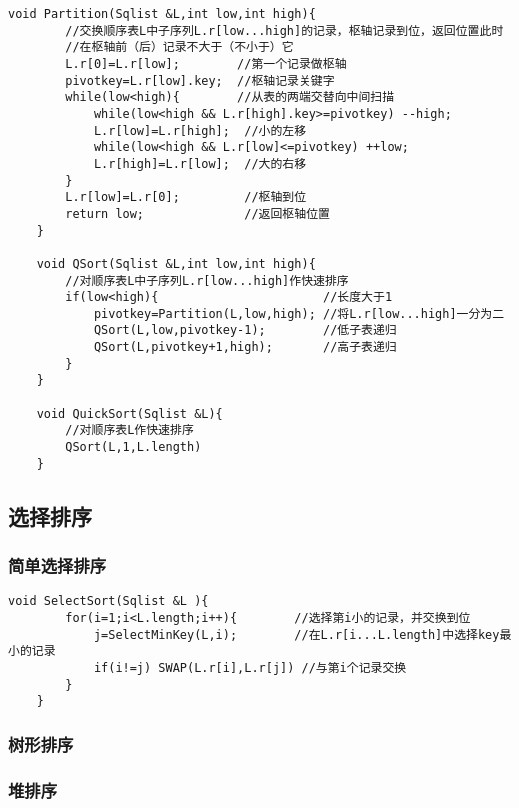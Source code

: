 \documentclass[UTF8]{ctexart}
\begin{document}
\begin{lstlisting}[style=v1]
    void Partition(Sqlist &L,int low,int high){
        //交换顺序表L中子序列L.r[low...high]的记录，枢轴记录到位，返回位置此时
        //在枢轴前（后）记录不大于（不小于）它
        L.r[0]=L.r[low];        //第一个记录做枢轴
        pivotkey=L.r[low].key;  //枢轴记录关键字
        while(low<high){        //从表的两端交替向中间扫描
            while(low<high && L.r[high].key>=pivotkey) --high;
            L.r[low]=L.r[high];  //小的左移
            while(low<high && L.r[low]<=pivotkey) ++low;
            L.r[high]=L.r[low];  //大的右移   
        }
        L.r[low]=L.r[0];         //枢轴到位  
        return low;              //返回枢轴位置  
    }

    void QSort(Sqlist &L,int low,int high){
        //对顺序表L中子序列L.r[low...high]作快速排序
        if(low<high){                       //长度大于1
            pivotkey=Partition(L,low,high); //将L.r[low...high]一分为二
            QSort(L,low,pivotkey-1);        //低子表递归
            QSort(L,pivotkey+1,high);       //高子表递归
        }
    }

    void QuickSort(Sqlist &L){
        //对顺序表L作快速排序
        QSort(L,1,L.length)
    }

\end{lstlisting}
 
\subsection{选择排序}
 
\subsubsection{简单选择排序}

\begin{lstlisting}[style=v1]
    void SelectSort(Sqlist &L ){
        for(i=1;i<L.length;i++){        //选择第i小的记录，并交换到位
            j=SelectMinKey(L,i);        //在L.r[i...L.length]中选择key最小的记录
            if(i!=j) SWAP(L.r[i],L.r[j]) //与第i个记录交换
        }
    }
\end{lstlisting}
\subsubsection{树形排序}

\subsubsection{堆排序}
\end{document}
